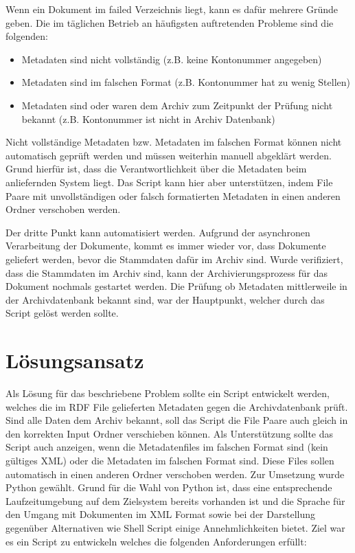 \documentclass[a4paper,oneside, 12pt]{report}
\begin{document}
Wenn ein Dokument im failed Verzeichnis liegt, kann es dafür mehrere Gründe geben. Die im täglichen Betrieb an häufigsten auftretenden Probleme sind die folgenden:
\begin{itemize}\itemsep=0.5pt
  \item Metadaten sind nicht vollständig  (z.B. keine Kontonummer angegeben)
  \item Metadaten sind im falschen Format (z.B. Kontonummer hat zu wenig Stellen)
  \item Metadaten sind oder waren dem Archiv zum Zeitpunkt der Prüfung nicht bekannt (z.B. Kontonummer ist nicht in Archiv Datenbank)
\end{itemize}

Nicht vollständige Metadaten bzw. Metadaten im falschen Format können nicht automatisch geprüft werden und müssen weiterhin manuell abgeklärt werden. Grund hierfür ist, dass die Verantwortlichkeit über die Metadaten beim anliefernden System liegt. Das Script kann hier aber unterstützen, indem File Paare mit unvollständigen oder falsch formatierten Metadaten in einen anderen Ordner verschoben werden.

Der dritte Punkt kann automatisiert werden. Aufgrund der asynchronen Verarbeitung der Dokumente, kommt es immer wieder vor, dass Dokumente geliefert werden, bevor die Stammdaten dafür im Archiv sind. Wurde verifiziert, dass die Stammdaten im Archiv sind, kann der Archivierungsprozess für das Dokument nochmals gestartet werden. Die Prüfung ob Metadaten mittlerweile in der Archivdatenbank bekannt sind, war der Hauptpunkt, welcher durch das Script gelöst werden sollte.

\section{Lösungsansatz}
Als Lösung für das beschriebene Problem sollte ein Script entwickelt werden, welches die im \ac{RDF} File gelieferten Metadaten gegen die Archivdatenbank prüft. Sind alle Daten dem Archiv bekannt, soll das Script die File Paare auch gleich in den korrekten Input Ordner verschieben können. Als Unterstützung sollte das Script auch anzeigen, wenn die Metadatenfiles im falschen Format sind (kein gültiges XML) oder die Metadaten im falschen Format sind. Diese Files sollen automatisch in einen anderen Ordner verschoben werden. Zur Umsetzung wurde Python gewählt. Grund für die Wahl von Python ist, dass eine entsprechende Laufzeitumgebung auf dem Zielsystem bereits vorhanden ist und die Sprache für den Umgang mit Dokumenten im XML Format sowie bei der Darstellung gegenüber Alternativen wie Shell Script einige Annehmlichkeiten bietet. Ziel war es ein Script zu entwickeln welches die folgenden Anforderungen erfüllt:
\end{document}
